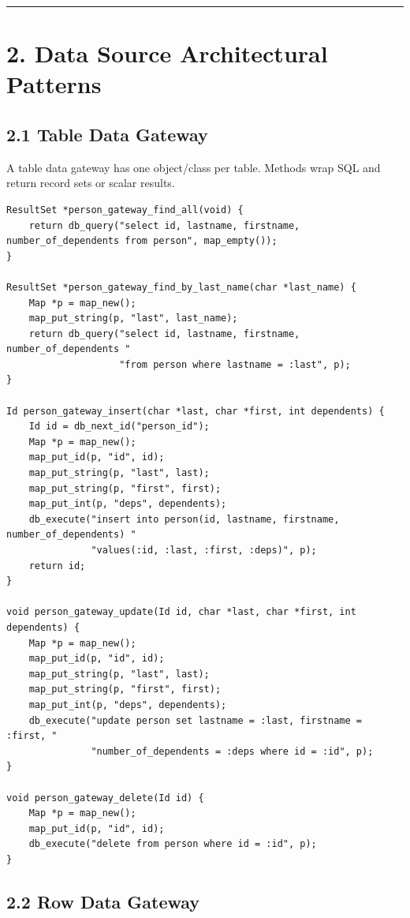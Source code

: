 \documentclass[11pt]{article}
\begin{document}
\begin{center}\rule{0.5\linewidth}{0.5pt}\end{center}

\section{2. Data Source Architectural
Patterns}\label{data-source-architectural-patterns}

\subsection{2.1 Table Data Gateway}\label{table-data-gateway}

A table data gateway has one object/class per table. Methods wrap SQL
and return record sets or scalar results.

\begin{verbatim}
ResultSet *person_gateway_find_all(void) {
    return db_query("select id, lastname, firstname, number_of_dependents from person", map_empty());
}

ResultSet *person_gateway_find_by_last_name(char *last_name) {
    Map *p = map_new();
    map_put_string(p, "last", last_name);
    return db_query("select id, lastname, firstname, number_of_dependents "
                    "from person where lastname = :last", p);
}

Id person_gateway_insert(char *last, char *first, int dependents) {
    Id id = db_next_id("person_id");
    Map *p = map_new();
    map_put_id(p, "id", id);
    map_put_string(p, "last", last);
    map_put_string(p, "first", first);
    map_put_int(p, "deps", dependents);
    db_execute("insert into person(id, lastname, firstname, number_of_dependents) "
               "values(:id, :last, :first, :deps)", p);
    return id;
}

void person_gateway_update(Id id, char *last, char *first, int dependents) {
    Map *p = map_new();
    map_put_id(p, "id", id);
    map_put_string(p, "last", last);
    map_put_string(p, "first", first);
    map_put_int(p, "deps", dependents);
    db_execute("update person set lastname = :last, firstname = :first, "
               "number_of_dependents = :deps where id = :id", p);
}

void person_gateway_delete(Id id) {
    Map *p = map_new();
    map_put_id(p, "id", id);
    db_execute("delete from person where id = :id", p);
}
\end{verbatim}

\subsection{2.2 Row Data Gateway}\label{row-data-gateway}
\end{document}

